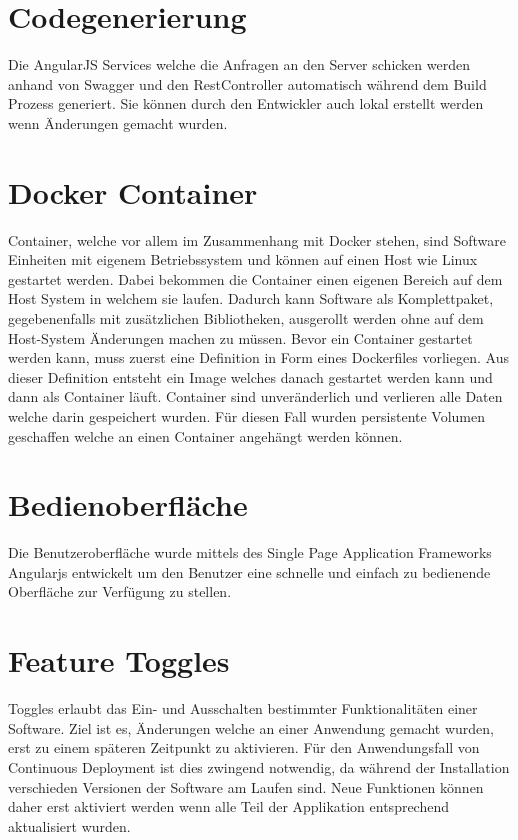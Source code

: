 \section{Codegenerierung}

Die AngularJS Services welche die Anfragen an den Server schicken werden anhand von Swagger und den RestController automatisch während dem Build Prozess generiert. Sie können durch den Entwickler auch lokal erstellt werden wenn Änderungen gemacht wurden.

\section{Docker Container}
\label{container}
Container, welche vor allem im Zusammenhang mit Docker stehen, sind Software Einheiten mit eigenem Betriebssystem und können auf einen Host wie Linux gestartet werden. Dabei bekommen die Container einen eigenen Bereich auf dem Host System in welchem sie laufen. Dadurch kann Software als Komplettpaket, gegebenenfalls mit zusätzlichen Bibliotheken, ausgerollt werden ohne auf dem Host-System Änderungen machen zu müssen. \newline
Bevor ein Container gestartet werden kann, muss zuerst eine Definition in Form eines Dockerfiles vorliegen. Aus dieser Definition entsteht ein Image welches danach gestartet werden kann und dann als Container läuft. Container sind unveränderlich und verlieren alle Daten welche darin gespeichert wurden. Für diesen Fall wurden persistente Volumen geschaffen welche an einen Container angehängt werden können.

\section{Bedienoberfläche}

Die Benutzeroberfläche wurde mittels des Single Page Application Frameworks Angularjs entwickelt um den Benutzer eine schnelle und einfach zu bedienende Oberfläche zur Verfügung zu stellen. 

\section{Feature Toggles}
\label{toggles}

Toggles erlaubt das Ein- und Ausschalten bestimmter Funktionalitäten einer Software. Ziel ist es, Änderungen welche an einer Anwendung gemacht wurden, erst zu einem späteren Zeitpunkt zu aktivieren. Für den Anwendungsfall von Continuous Deployment ist dies zwingend notwendig, da während der Installation verschieden Versionen der Software am Laufen sind. Neue Funktionen können daher erst aktiviert werden wenn alle Teil der Applikation entsprechend aktualisiert wurden.

